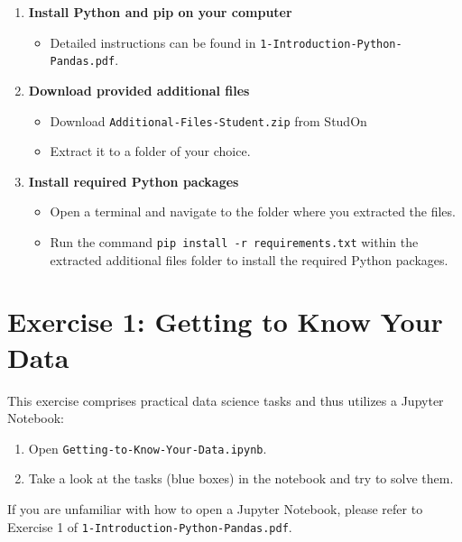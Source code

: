 \documentclass[
english,
smallborders
]{i6prcsht}
\begin{document}
\begin{enumerate}
	\item \textbf{Install Python and pip on your computer}
	      
	      \begin{itemize}
		      \item Detailed instructions can be found in \texttt{1-Introduction-Python-Pandas.pdf}.
	      \end{itemize}
	      
	\item \textbf{Download provided additional files}
	      
	      \begin{itemize}
		      \item Download \texttt{Additional-Files-Student.zip} from StudOn
		      \item Extract it to a folder of your choice.
	      \end{itemize}
	      
	\item \textbf{Install required Python packages}
	      
	      \begin{itemize}
		      \item Open a terminal and navigate to the folder where you extracted the files.
		      \item Run the command \texttt{pip install -r requirements.txt} within the extracted additional files folder to install the required Python packages.
	      \end{itemize}
	      
	      
\end{enumerate}

\section*{Exercise 1: Getting to Know Your Data}

This exercise comprises practical data science tasks and thus utilizes a Jupyter Notebook:

\begin{enumerate}
	\item Open \texttt{Getting-to-Know-Your-Data.ipynb}.
	\item Take a look at the tasks (blue boxes) in the notebook and try to solve them.
\end{enumerate}

If you are unfamiliar with how to open a Jupyter Notebook, please refer to Exercise 1 of \texttt{1-Introduction-Python-Pandas.pdf}.
\end{document}

